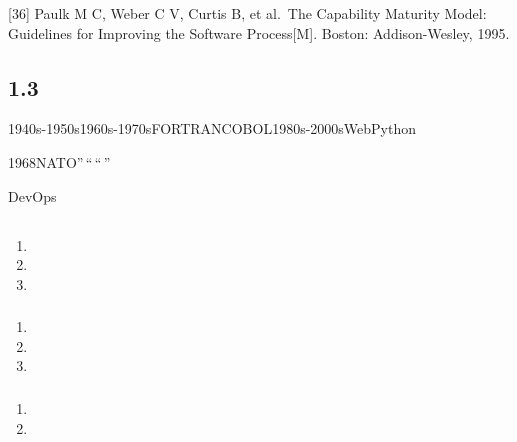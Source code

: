 {[}36{]} Paulk M C, Weber C V, Curtis B, et al.~The Capability Maturity
Model: Guidelines for Improving the Software Process{[}M{]}. Boston:
Addison-Wesley, 1995.

\hypertarget{section-27}{%
\subsection{1.3}\label{section-27}}

1940s-1950s1960s-1970sFORTRANCOBOL1980s-2000sWebPython

1968NATO''\,``\,``\,''

DevOps

\hypertarget{section-28}{%
\subsection{}\label{section-28}}

\hypertarget{section-29}{%
\subsubsection{}\label{section-29}}

\begin{enumerate}
\def\labelenumi{\arabic{enumi}.}
\tightlist
\item
\item
\item
\end{enumerate}

\hypertarget{section-30}{%
\subsubsection{}\label{section-30}}

\begin{enumerate}
\def\labelenumi{\arabic{enumi}.}
\tightlist
\item
\item
\item
\end{enumerate}

\hypertarget{section-31}{%
\subsubsection{}\label{section-31}}

\begin{enumerate}
\def\labelenumi{\arabic{enumi}.}
\tightlist
\item
\item
\end{enumerate}

\hypertarget{section-32}{%
\subsection{}\label{section-32}}